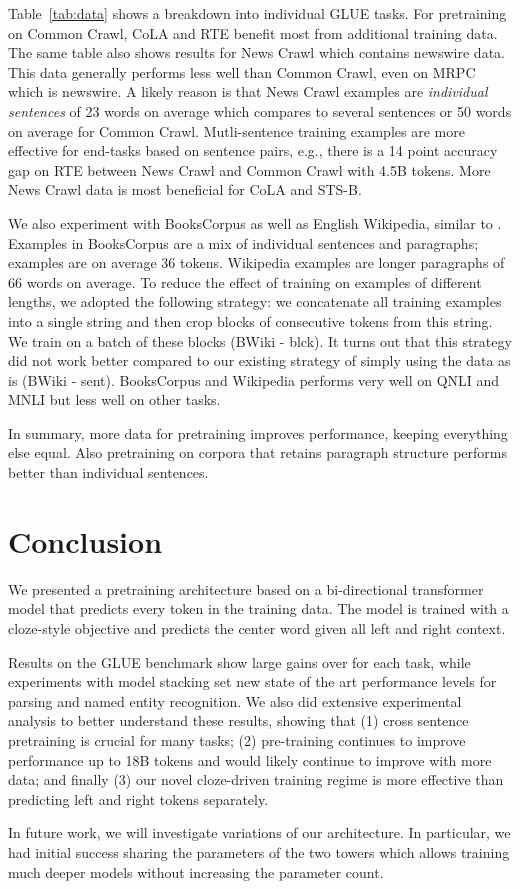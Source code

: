 \documentclass[11pt,a4paper]{article}
\begin{document}
Table~\ref{tab:data} shows a breakdown into individual GLUE tasks.
For pretraining on Common Crawl, CoLA and RTE benefit most from additional training data.
The same table also shows results for News Crawl which contains newswire data.
This data generally performs less well than Common Crawl, even on MRPC which is newswire.
A likely reason is that News Crawl examples are \emph{individual sentences} of 23 words on average which compares to several sentences or 50 words on average for Common Crawl.
Mutli-sentence training examples are more effective for end-tasks based on sentence pairs, e.g., there is a 14 point accuracy gap on RTE between News Crawl and Common Crawl with 4.5B tokens.
More News Crawl data is most beneficial for CoLA and STS-B. 

We also experiment with BooksCorpus \citep{zhu2015books} as well as English Wikipedia, similar to \citet{devlin2018bert}. 
Examples in BooksCorpus are a mix of individual sentences and paragraphs; examples are on average 36 tokens.
Wikipedia examples are longer paragraphs of 66 words on average.
To reduce the effect of training on examples of different lengths, we adopted the following strategy: we concatenate all training examples into a single string and then crop blocks of  consecutive tokens from this string. 
We train on a batch of these blocks (BWiki - blck).
It turns out that this strategy did not work better compared to our existing strategy of simply using the data as is (BWiki - sent).
BooksCorpus and Wikipedia performs very well on QNLI and MNLI but less well on other tasks.

In summary, more data for pretraining improves performance, keeping everything else equal. 
Also pretraining on corpora that retains paragraph structure performs better than individual sentences.




\section{Conclusion}

We presented a pretraining architecture based on a bi-directional transformer model that predicts every token in the training data.
The model is trained with a cloze-style objective and predicts the center word given all left and right context.

Results on the GLUE benchmark show large gains over \citet{radford2018unsup} for each task, while experiments with model stacking set new state of the art performance levels for parsing and named entity recognition. We also did extensive experimental analysis to better understand these results, showing that (1)  cross sentence pretraining is crucial for many tasks; (2) pre-training continues to improve performance up to 18B tokens and would likely continue to improve with more data; and finally (3) our novel cloze-driven training regime is more effective than predicting left and right tokens separately.

In future work, we will investigate variations of our architecture. In particular, we had initial success sharing the parameters of the two towers which allows training much deeper models without increasing the parameter count.




\end{document}
